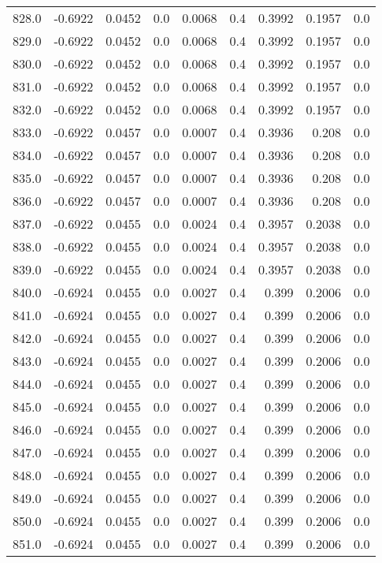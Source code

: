 \begin{longtable}{lrrrrrrrr}
828.0 & -0.6922 & 0.0452 & 0.0 & 0.0068 & 0.4 & 0.3992 & 0.1957 & 0.0 \\
829.0 & -0.6922 & 0.0452 & 0.0 & 0.0068 & 0.4 & 0.3992 & 0.1957 & 0.0 \\
830.0 & -0.6922 & 0.0452 & 0.0 & 0.0068 & 0.4 & 0.3992 & 0.1957 & 0.0 \\
831.0 & -0.6922 & 0.0452 & 0.0 & 0.0068 & 0.4 & 0.3992 & 0.1957 & 0.0 \\
832.0 & -0.6922 & 0.0452 & 0.0 & 0.0068 & 0.4 & 0.3992 & 0.1957 & 0.0 \\
833.0 & -0.6922 & 0.0457 & 0.0 & 0.0007 & 0.4 & 0.3936 & 0.208 & 0.0 \\
834.0 & -0.6922 & 0.0457 & 0.0 & 0.0007 & 0.4 & 0.3936 & 0.208 & 0.0 \\
835.0 & -0.6922 & 0.0457 & 0.0 & 0.0007 & 0.4 & 0.3936 & 0.208 & 0.0 \\
836.0 & -0.6922 & 0.0457 & 0.0 & 0.0007 & 0.4 & 0.3936 & 0.208 & 0.0 \\
837.0 & -0.6922 & 0.0455 & 0.0 & 0.0024 & 0.4 & 0.3957 & 0.2038 & 0.0 \\
838.0 & -0.6922 & 0.0455 & 0.0 & 0.0024 & 0.4 & 0.3957 & 0.2038 & 0.0 \\
839.0 & -0.6922 & 0.0455 & 0.0 & 0.0024 & 0.4 & 0.3957 & 0.2038 & 0.0 \\
840.0 & -0.6924 & 0.0455 & 0.0 & 0.0027 & 0.4 & 0.399 & 0.2006 & 0.0 \\
841.0 & -0.6924 & 0.0455 & 0.0 & 0.0027 & 0.4 & 0.399 & 0.2006 & 0.0 \\
842.0 & -0.6924 & 0.0455 & 0.0 & 0.0027 & 0.4 & 0.399 & 0.2006 & 0.0 \\
843.0 & -0.6924 & 0.0455 & 0.0 & 0.0027 & 0.4 & 0.399 & 0.2006 & 0.0 \\
844.0 & -0.6924 & 0.0455 & 0.0 & 0.0027 & 0.4 & 0.399 & 0.2006 & 0.0 \\
845.0 & -0.6924 & 0.0455 & 0.0 & 0.0027 & 0.4 & 0.399 & 0.2006 & 0.0 \\
846.0 & -0.6924 & 0.0455 & 0.0 & 0.0027 & 0.4 & 0.399 & 0.2006 & 0.0 \\
847.0 & -0.6924 & 0.0455 & 0.0 & 0.0027 & 0.4 & 0.399 & 0.2006 & 0.0 \\
848.0 & -0.6924 & 0.0455 & 0.0 & 0.0027 & 0.4 & 0.399 & 0.2006 & 0.0 \\
849.0 & -0.6924 & 0.0455 & 0.0 & 0.0027 & 0.4 & 0.399 & 0.2006 & 0.0 \\
850.0 & -0.6924 & 0.0455 & 0.0 & 0.0027 & 0.4 & 0.399 & 0.2006 & 0.0 \\
851.0 & -0.6924 & 0.0455 & 0.0 & 0.0027 & 0.4 & 0.399 & 0.2006 & 0.0 \\

\end{longtable}
